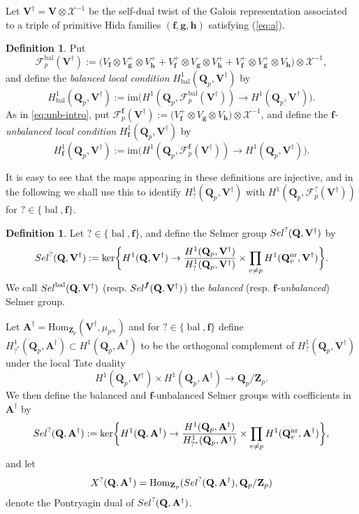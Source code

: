 \documentclass[10pt,letterpaper]{amsart}
\theoremstyle{plain}
\theoremstyle{definition}
\newtheorem{defn}[thm]{Definition}
\theoremstyle{definition}
\theoremstyle{plain}
\theoremstyle{plain}
\theoremstyle{plain}
\theoremstyle{remark}
\numberwithin{equation}{section}
\newcommand{\Sel}{Sel}
\newcommand{\rH}{H}
\DeclareMathOperator{\bal}{\mathrm{bal}}
\newcommand{\Vdag}{{\mathbf{V}^\dagger}}
\newcommand{\Adag}{{\mathbf{A}^\dagger}}
\newcommand{\unb}{{\boldsymbol{f}}}
\newcommand{\Q}{\mathbf{Q}}
\newcommand{\Z}{\mathbf{Z}}
\def\Sel{{\rm Sel}}
\newcommand{\any}{?}
\newcommand{\bff}{{\boldsymbol{f}}}
\newcommand{\bfg}{{\boldsymbol{g}}}
\newcommand{\bfh}{{\boldsymbol{h}}}
\begin{document}
Let $\Vdag=\mathbf{V}\otimes\mathcal{X}^{-1}$ be the self-dual twist of the Galois representation associated to a triple of primitive Hida families $(\bff,\bfg,\bfh)$ %
satisfying (\ref{eq:a}).

\begin{defn}\label{def:local-p}
Put
\[
\mathscr{F}^{\bal}_p(\Vdag)%
:=\bigl(V_{\bff}\otimes V_{\bfg}^+\otimes V_{\bfh}^++V_{\bff}^+\otimes V_{\bfg}\otimes V_{\bfh}^++V_{\bff}^+\otimes V_{\bfg}^+\otimes V_{\bfh}\bigr)\otimes\mathcal{X}^{-1},
\]
and define the \emph{balanced local condition} $\rH^1_{\bal}(\Q_p,\Vdag)$ by 
\[
\rH^1_{\bal}(\Q_p,\Vdag):={\mathrm{im}}\bigl(\rH^1(\Q_p,\mathscr{F}_p^{\bal}(\Vdag))\rightarrow\rH^1(\Q_p,\Vdag)\bigr).
\]
As in \eqref{eq:unb-intro}, put $\mathscr{F}_p^{\unb}(\Vdag):=\bigl(V_{\bff}^+\otimes V_{\bfg}\otimes V_{\bfh}\bigr)\otimes\mathcal{X}^{-1}$, and define the \emph{$\bff$-unbalanced local condition} $\rH^1_{\unb}(\Q_p,\Vdag)$ by
\[
\rH^1_{\bff}(\Q_p,\Vdag):={\mathrm{im}}\bigl(\rH^1(\Q_p,\mathscr{F}_p^{\bff}(\Vdag))\rightarrow\rH^1(\Q_p,\Vdag)\bigr).
\]
\end{defn}

It is easy to see that the maps appearing in these definitions are injective, and in the following we shall use this to identify $\rH^1_{\any}(\Q_p,\Vdag)$ with $\rH^1(\Q_p,\mathscr{F}_p^\any(\Vdag))$ for $\any\in\{{\bal},\unb\}$.

\begin{defn}\label{def:Sel-bu}
Let $\any\in\{{\bal},\unb\}$, and define the Selmer group $\Sel^\any(\Q,\Vdag)$ by
\[
\Sel^\any(\Q,\Vdag):={\mathrm{ker}}\biggl\{\rH^1(\Q,\Vdag)\rightarrow\frac{\rH^1(\Q_p,\Vdag)}{\rH^1_\any(\Q_p,\Vdag)}\times\prod_{v\neq p}\rH^1(\Q_v^{\mathrm{nr}},\Vdag)\biggr\}.
\]
We call $\Sel^{\bal}(\Q,\Vdag)$ (resp. $\Sel^{\bff}(\Q,\Vdag)$) the \emph{balanced} (resp. \emph{$\bff$-unbalanced}) Selmer group.
\end{defn}

Let $\Adag={\mathrm{Hom}}_{\Z_p}(\Vdag,\mu_{p^\infty})$ and for $\any\in\{{\bal},\bff\}$ define $\rH^1_{\any^*}(\Q_p,\Adag)\subset\rH^1(\Q_p,\Adag)$ to be the orthogonal complement of $\rH^1_\any(\Q_p,\Vdag)$ under the local Tate duality
\[
\rH^1(\Q_p,\Vdag)\times\rH^1(\Q_p,\Adag)\rightarrow\Q_p/\Z_p.
\]
We then define the balanced and $\bff$-unbalanced Selmer groups with coefficients in $\Adag$ by
\[
\Sel^{\any}(\Q,\Adag):={\mathrm{ker}}\biggl\{\rH^1(\Q,\Adag)\rightarrow\frac{\rH^1(\Q_p,\Adag)}{\rH_{\any^*}^1(\Q_p,\Adag)}\times\prod_{v\neq p}\rH^1(\Q_v^{\mathrm{nr}},\Adag)\biggr\},
\]
and let \[X^{\any}(\Q,\Adag)={\mathrm{Hom}}_{\Z_p}(\Sel^{\any}(\Q,\Adag),\Q_p/\Z_p)\] denote the Pontryagin dual of $\Sel^{\any}(\Q,\Adag)$.
\end{document}
